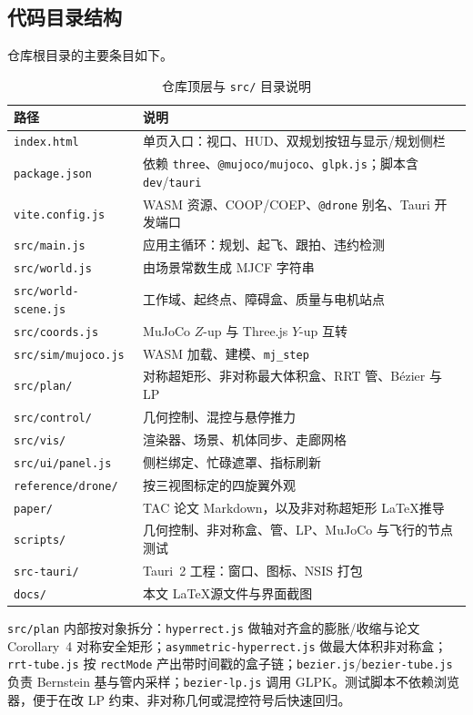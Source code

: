 \documentclass[UTF8,a4paper,11pt,zihao=-4]{ctexart}
\begin{document}
\subsection{代码目录结构}

仓库根目录的主要条目如下。

\begin{table}[htbp]
\centering
\caption{仓库顶层与 \texttt{src/} 目录说明}
\label{tab:tree}
\small
\begin{tabularx}{\textwidth}{@{}lX@{}}
\toprule
路径 & 说明 \\
\midrule
\texttt{index.html} & 单页入口：视口、HUD、双规划按钮与显示/规划侧栏 \\
\texttt{package.json} & 依赖 \texttt{three}、\texttt{@mujoco/mujoco}、\texttt{glpk.js}；脚本含 \texttt{dev}/\texttt{tauri} \\
\texttt{vite.config.js} & WASM 资源、COOP/COEP、\texttt{@drone} 别名、Tauri 开发端口 \\
\texttt{src/main.js} & 应用主循环：规划、起飞、跟拍、违约检测 \\
\texttt{src/world.js} & 由场景常数生成 MJCF 字符串 \\
\texttt{src/world-scene.js} & 工作域、起终点、障碍盒、质量与电机站点 \\
\texttt{src/coords.js} & MuJoCo $Z$-up 与 Three.js $Y$-up 互转 \\
\texttt{src/sim/mujoco.js} & WASM 加载、建模、\texttt{mj\_step} \\
\texttt{src/plan/} & 对称超矩形、非对称最大体积盒、RRT 管、B\'ezier 与 LP \\
\texttt{src/control/} & 几何控制、混控与悬停推力 \\
\texttt{src/vis/} & 渲染器、场景、机体同步、走廊网格 \\
\texttt{src/ui/panel.js} & 侧栏绑定、忙碌遮罩、指标刷新 \\
\texttt{reference/drone/} & 按三视图标定的四旋翼外观 \\
\texttt{paper/} & TAC 论文 Markdown，以及非对称超矩形 \LaTeX 推导 \\
\texttt{scripts/} & 几何控制、非对称盒、管、LP、MuJoCo 与飞行的节点测试 \\
\texttt{src-tauri/} & Tauri~2 工程：窗口、图标、NSIS 打包 \\
\texttt{docs/} & 本文 \LaTeX 源文件与界面截图 \\
\bottomrule
\end{tabularx}
\end{table}

\texttt{src/plan} 内部按对象拆分：\texttt{hyperrect.js} 做轴对齐盒的膨胀/收缩与论文 Corollary~4 对称安全矩形；\texttt{asymmetric-hyperrect.js} 做最大体积非对称盒；\texttt{rrt-tube.js} 按 \texttt{rectMode} 产出带时间戳的盒子链；\texttt{bezier.js}/\texttt{bezier-tube.js} 负责 Bernstein 基与管内采样；\texttt{bezier-lp.js} 调用 GLPK。测试脚本不依赖浏览器，便于在改 LP 约束、非对称几何或混控符号后快速回归。
\end{document}
